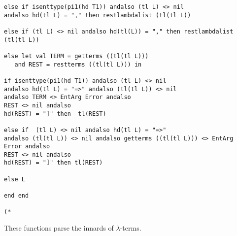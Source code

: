 \documentclass{article}
\begin{document}
\begin{verbatim}
else if isenttype(pi1(hd T1)) andalso (tl L) <> nil 
andalso hd(tl L) = "," then restlambdalist (tl(tl L))

else if (tl L) <> nil andalso hd(tl(L)) = "," then restlambdalist (tl(tl L))

else let val TERM = getterms ((tl(tl L))) 
   and REST = restterms ((tl(tl L))) in

if isenttype(pi1(hd T1)) andalso (tl L) <> nil 
andalso hd(tl L) = "=>" andalso (tl(tl L)) <> nil 
andalso TERM <> EntArg Error andalso
REST <> nil andalso
hd(REST) = "]" then  tl(REST)

else if  (tl L) <> nil andalso hd(tl L) = "=>" 
andalso (tl(tl L)) <> nil andalso getterms ((tl(tl L))) <> EntArg Error andalso
REST <> nil andalso
hd(REST) = "]" then tl(REST)

else L

end end

(*

\end{verbatim}

These functions parse the innards of $\lambda$-terms.
\end{document}
